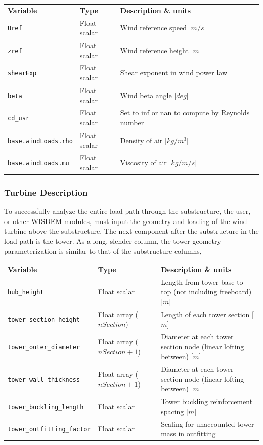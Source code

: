 {\footnotesize
  \begin{tabularx}{\linewidth}{ l l X }
    \textbf{Variable} & \textbf{Type} & \textbf{Description \& units} \\
    \texttt{Uref}        & Float scalar & Wind reference speed [$m/s$]\\
    \texttt{zref}        & Float scalar & Wind reference height [$m$]\\
    \texttt{shearExp}    & Float scalar & Shear exponent in wind power law\\
    \texttt{beta}        & Float scalar & Wind beta angle [$deg$]\\
    \texttt{cd\_usr}      & Float scalar & Set to inf or nan to compute by Reynolds number\\
    \texttt{base.windLoads.rho} & Float scalar & Density of air [$kg/m^3$]\\
    \texttt{base.windLoads.mu}  & Float scalar & Viscosity of air [$kg/m/s$]\\
  \end{tabularx}
}


\subsubsection{Turbine Description}
To successfully analyze the entire load path through the substructure,
the user, or other WISDEM modules, must input the geometry and loading of
the wind turbine above the substructure.  The next component after the
substructure in the load path is the tower.  As a long, slender column,
the tower geometry parameterization is similar to that of the
substructure columns,

{\footnotesize
  \begin{tabularx}{\linewidth}{ l l X }
    \textbf{Variable} & \textbf{Type} & \textbf{Description \& units} \\
    \texttt{hub\_height}              & Float scalar & Length from tower base to top (not including freeboard) [$m$]\\
    \texttt{tower\_section\_height}    & Float array ($nSection$) & Length of each tower section [$m$]\\
    \texttt{tower\_outer\_diameter}    & Float array ($nSection+1$) & Diameter at each tower section node (linear lofting between) [$m$]\\
    \texttt{tower\_wall\_thickness}    & Float array ($nSection+1$) & Diameter at each tower section node (linear lofting between) [$m$]\\
    \texttt{tower\_buckling\_length}   & Float scalar & Tower buckling reinforcement spacing [$m$]\\
    \texttt{tower\_outfitting\_factor} & Float scalar & Scaling for unaccounted tower mass in outfitting\\
  \end{tabularx}
}

